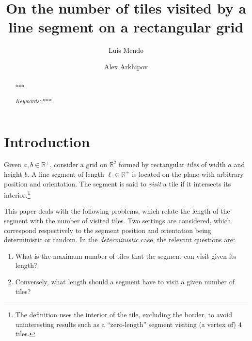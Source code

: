\documentclass[12pt, a4paper]{article}
\makeatletter
\newcommand{\len}{\ell} %
\renewcommand\theenumi{(\@roman\c@enumi)} %
\renewcommand\labelenumi{\theenumi} %
\makeatother
\begin{document}
\title{
On the number of tiles visited by a\\
line segment on a rectangular grid
}

\author[1]{Luis Mendo}
\author[2]{Alex Arkhipov}




\maketitle

\begin{abstract}
***

\emph{Keywords:} ***.

\end{abstract}


\section{Introduction}
\label{part: intro}

Given $a, b \in \mathbb R^+$, consider a grid on $\mathbb R^2$ formed by rectangular \emph{tiles} of width $a$ and height $b$. A line segment of length $\len \in \mathbb R^+$ is located on the plane with arbitrary position and orientation. The segment is said to \emph{visit} a tile if it intersects its interior.\footnote{
The definition uses the interior of the tile, excluding the border, to avoid uninteresting results such as a ``zero-length'' segment visiting (a vertex of) $4$ tiles.}

This paper deals with the following problems, which relate the length of the segment with the number of visited tiles. Two settings are considered, which correspond respectively to the segment position and orientation being deterministic or random. In the \emph{deterministic} case, the relevant questions are:
\begin{enumerate}
\renewcommand{\labelenumi}{(1\alph{enumi})}
\renewcommand{\theenumi}{(1\alph{enumi})}
\item
\label{prob: determ dir}
What is the maximum number of tiles that the segment can visit given its length?
\item
\label{prob: determ inv}
Conversely, what length should a segment have to visit a given number of tiles?
\end{enumerate}
\end{document}
